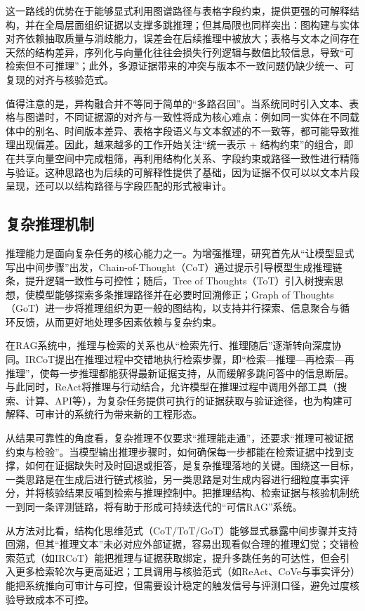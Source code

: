 这一路线的优势在于能够显式利用图谱路径与表格字段约束，提供更强的可解释结构，并在全局层面组织证据以支撑多跳推理\cite{ref15, ref16, ref17, ref18}；但其局限也同样突出：图构建与实体对齐依赖抽取质量与消歧能力，误差会在后续推理中被放大；表格与文本之间存在天然的结构差异，序列化与向量化往往会损失行列逻辑与数值比较信息，导致“可检索但不可推理”；此外，多源证据带来的冲突与版本不一致问题仍缺少统一、可复现的对齐与核验范式\cite{hybridqa, ottqa, ref19}。

值得注意的是，异构融合并不等同于简单的“多路召回”。当系统同时引入文本、表格与图谱时，不同证据源的对齐与一致性将成为核心难点：例如同一实体在不同载体中的别名、时间版本差异、表格字段语义与文本叙述的不一致等，都可能导致推理出现偏差。因此，越来越多的工作开始关注“统一表示 + 结构约束”的组合，即在共享向量空间中完成粗筛，再利用结构化关系、字段约束或路径一致性进行精筛与验证。这种思路也为后续的可解释性提供了基础，因为证据不仅可以以文本片段呈现，还可以以结构路径与字段匹配的形式被审计。

\subsection{复杂推理机制}
推理能力是面向复杂任务的核心能力之一。为增强推理，研究首先从“让模型显式写出中间步骤”出发，Chain-of-Thought（CoT）\cite{ref2}通过提示引导模型生成推理链条，提升逻辑一致性与可控性；随后，Tree of Thoughts（ToT）\cite{ref4}引入树搜索思想，使模型能够探索多条推理路径并在必要时回溯修正；Graph of Thoughts（GoT）\cite{ref5}进一步将推理组织为更一般的图结构，以支持并行探索、信息聚合与循环反馈，从而更好地处理多因素依赖与复杂约束。

在RAG系统中，推理与检索的关系也从“检索先行、推理随后”逐渐转向深度协同。IRCoT\cite{ref26}提出在推理过程中交错地执行检索步骤，即“检索—推理—再检索—再推理”，使每一步推理都能获得最新证据支持，从而缓解多跳问答中的信息断层。与此同时，ReAct\cite{ref23}将推理与行动结合，允许模型在推理过程中调用外部工具（搜索、计算、API等），为复杂任务提供可执行的证据获取与验证途径，也为构建可解释、可审计的系统行为带来新的工程形态。

从结果可靠性的角度看，复杂推理不仅要求“推理能走通”，还要求“推理可被证据约束与检验”。当模型输出推理步骤时，如何确保每一步都能在检索证据中找到支撑，如何在证据缺失时及时回退或拒答，是复杂推理落地的关键。围绕这一目标，一类思路是在生成后进行链式核验\cite{ref24}，另一类思路是对生成内容进行细粒度事实评分\cite{ref25}，并将核验结果反哺到检索与推理控制中。把推理结构、检索证据与核验机制统一到同一条评测链路，将有助于形成可持续迭代的“可信RAG”系统。

从方法对比看，结构化思维范式（CoT/ToT/GoT）能够显式暴露中间步骤并支持回溯，但其“推理文本”未必对应外部证据，容易出现看似合理的推理幻觉；交错检索范式（如IRCoT）能把推理与证据获取绑定，提升多跳任务的可达性，但会引入更多检索轮次与更高延迟；工具调用与核验范式（如ReAct、CoVe与事实评分）能把系统推向可审计与可控，但需要设计稳定的触发信号与评测口径，避免过度核验导致成本不可控\cite{ref2, ref4, ref5, ref23, ref24, ref25, ref26}。

